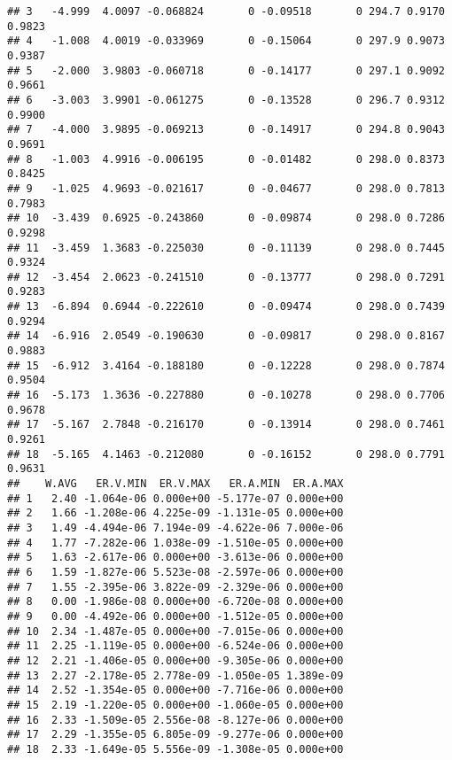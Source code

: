 \documentclass{article}\usepackage[]{graphicx}\usepackage[]{color}
\makeatletter
\newenvironment{kframe}{%
 \def\at@end@of@kframe{}%
 \ifinner\ifhmode%
  \def\at@end@of@kframe{\end{minipage}}%
  \begin{minipage}{\columnwidth}%
 \fi\fi%
 \def\FrameCommand##1{\hskip\@totalleftmargin \hskip-\fboxsep
 \colorbox{shadecolor}{##1}\hskip-\fboxsep
     \hskip-\linewidth \hskip-\@totalleftmargin \hskip\columnwidth}%
 \MakeFramed {\advance\hsize-\width
   \@totalleftmargin\z@ \linewidth\hsize
   \@setminipage}}%
 {\par\unskip\endMakeFramed%
 \at@end@of@kframe}
\newenvironment{knitrout}{}{} %
\makeatother
\begin{document}
\begin{knitrout}
\begin{kframe}
\begin{verbatim}
## 3   -4.999  4.0097 -0.068824       0 -0.09518       0 294.7 0.9170 0.9823
## 4   -1.008  4.0019 -0.033969       0 -0.15064       0 297.9 0.9073 0.9387
## 5   -2.000  3.9803 -0.060718       0 -0.14177       0 297.1 0.9092 0.9661
## 6   -3.003  3.9901 -0.061275       0 -0.13528       0 296.7 0.9312 0.9900
## 7   -4.000  3.9895 -0.069213       0 -0.14917       0 294.8 0.9043 0.9691
## 8   -1.003  4.9916 -0.006195       0 -0.01482       0 298.0 0.8373 0.8425
## 9   -1.025  4.9693 -0.021617       0 -0.04677       0 298.0 0.7813 0.7983
## 10  -3.439  0.6925 -0.243860       0 -0.09874       0 298.0 0.7286 0.9298
## 11  -3.459  1.3683 -0.225030       0 -0.11139       0 298.0 0.7445 0.9324
## 12  -3.454  2.0623 -0.241510       0 -0.13777       0 298.0 0.7291 0.9283
## 13  -6.894  0.6944 -0.222610       0 -0.09474       0 298.0 0.7439 0.9294
## 14  -6.916  2.0549 -0.190630       0 -0.09817       0 298.0 0.8167 0.9883
## 15  -6.912  3.4164 -0.188180       0 -0.12228       0 298.0 0.7874 0.9504
## 16  -5.173  1.3636 -0.227880       0 -0.10278       0 298.0 0.7706 0.9678
## 17  -5.167  2.7848 -0.216170       0 -0.13914       0 298.0 0.7461 0.9261
## 18  -5.165  4.1463 -0.212080       0 -0.16152       0 298.0 0.7791 0.9631
##    W.AVG   ER.V.MIN  ER.V.MAX   ER.A.MIN  ER.A.MAX
## 1   2.40 -1.064e-06 0.000e+00 -5.177e-07 0.000e+00
## 2   1.66 -1.208e-06 4.225e-09 -1.131e-05 0.000e+00
## 3   1.49 -4.494e-06 7.194e-09 -4.622e-06 7.000e-06
## 4   1.77 -7.282e-06 1.038e-09 -1.510e-05 0.000e+00
## 5   1.63 -2.617e-06 0.000e+00 -3.613e-06 0.000e+00
## 6   1.59 -1.827e-06 5.523e-08 -2.597e-06 0.000e+00
## 7   1.55 -2.395e-06 3.822e-09 -2.329e-06 0.000e+00
## 8   0.00 -1.986e-08 0.000e+00 -6.720e-08 0.000e+00
## 9   0.00 -4.492e-06 0.000e+00 -1.512e-05 0.000e+00
## 10  2.34 -1.487e-05 0.000e+00 -7.015e-06 0.000e+00
## 11  2.25 -1.119e-05 0.000e+00 -6.524e-06 0.000e+00
## 12  2.21 -1.406e-05 0.000e+00 -9.305e-06 0.000e+00
## 13  2.27 -2.178e-05 2.778e-09 -1.050e-05 1.389e-09
## 14  2.52 -1.354e-05 0.000e+00 -7.716e-06 0.000e+00
## 15  2.19 -1.220e-05 0.000e+00 -1.060e-05 0.000e+00
## 16  2.33 -1.509e-05 2.556e-08 -8.127e-06 0.000e+00
## 17  2.29 -1.355e-05 6.805e-09 -9.277e-06 0.000e+00
## 18  2.33 -1.649e-05 5.556e-09 -1.308e-05 0.000e+00
\end{verbatim}
\end{kframe}
\end{knitrout}

\newpage
\end{document}
